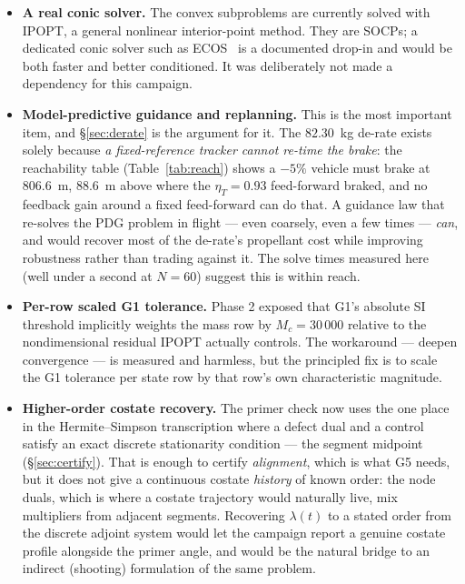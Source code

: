 \documentclass[11pt]{article}
\newcommand{\etaT}{\eta_T}
\begin{document}
\begin{itemize}
\item \textbf{A real conic solver.} The convex subproblems are
currently solved with IPOPT, a general nonlinear interior-point method.
They are SOCPs; a dedicated conic solver such as ECOS~\cite{ecos2013} is a
documented drop-in and would be both faster and better conditioned. It was
deliberately not made a dependency for this campaign.

\item \textbf{Model-predictive guidance and replanning.} This is the
most important item, and \S\ref{sec:derate} is the argument for it. The
$82.30$~kg de-rate exists solely because \emph{a fixed-reference tracker
cannot re-time the brake}: the reachability table (Table~\ref{tab:reach})
shows a $-5\%$ vehicle must brake at $806.6$~m, $88.6$~m above where the
$\etaT = 0.93$ feed-forward braked, and no feedback gain around a fixed
feed-forward can do that. A guidance law that re-solves the PDG problem in flight ---
even coarsely, even a few times --- \emph{can}, and would recover most of
the de-rate's propellant cost while improving robustness rather than
trading against it. The solve times measured here (well under a second at
$N = 60$) suggest this is within reach.

\item \textbf{Per-row scaled G1 tolerance.} Phase 2 exposed that G1's
absolute SI threshold implicitly weights the mass row by $M_c = 30\,000$
relative to the nondimensional residual IPOPT actually controls. The
workaround --- deepen convergence --- is measured and harmless, but the
principled fix is to scale the G1 tolerance per state row by that row's own
characteristic magnitude.

\item \textbf{Higher-order costate recovery.} The primer check now uses the
one place in the Hermite--Simpson transcription where a defect dual and a
control satisfy an exact discrete stationarity condition --- the segment
midpoint (\S\ref{sec:certify}). That is enough to certify \emph{alignment},
which is what G5 needs, but it does not give a continuous costate
\emph{history} of known order: the node duals, which is where a costate
trajectory would naturally live, mix multipliers from adjacent segments.
Recovering $\lambda(t)$ to a stated order from the discrete adjoint system
would let the campaign report a genuine costate profile alongside the
primer angle, and would be the natural bridge to an indirect (shooting)
formulation of the same problem.

\end{itemize}
\end{document}
